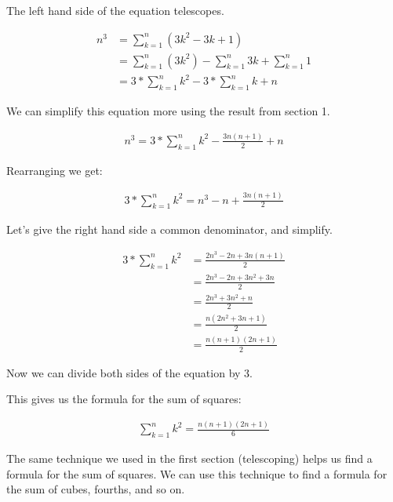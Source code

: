 \documentclass{article}
\begin{document}
\begin{flushleft}
The left hand side of the equation telescopes.
\end{flushleft}
\begin{align*}
n^3 &= \sum_{k=1}^{n} (3k^2 - 3k + 1) \\
&= \sum_{k=1}^{n} (3k^2) - \sum_{k=1}^{n} 3k + \sum_{k=1}^{n} 1 \\
&= 3 * \sum_{k=1}^{n} k^2 - 3 * \sum_{k=1}^{n} k + n
\end{align*}
\begin{flushleft}
We can simplify this equation more using the result from section 1.
\end{flushleft}
\begin{align*}
n^3 =  3 * \sum_{k=1}^{n} k^2 - \frac{3n(n+1)}{2} + n
\end{align*}
\begin{flushleft}
Rearranging we get:
\end{flushleft}
\begin{align*}
3 * \sum_{k=1}^{n} k^2 = n^3 - n + \frac{3n(n+1)}{2} 
\end{align*}
\begin{flushleft}
Let's give the right hand side a common denominator, and simplify.
\end{flushleft}
\begin{align*}
3 * \sum_{k=1}^{n} k^2 &= \frac{2n^3 - 2n + 3n(n+1)}{2} \\
&= \frac{2n^3 - 2n + 3n^2 + 3n}{2} \\
&= \frac{2n^3 + 3n^2 + n}{2} \\
&= \frac{n(2n^2 + 3n + 1)}{2} \\
&= \frac{n(n+1)(2n+1)}{2} 
\end{align*}
\begin{flushleft}
Now we can divide both sides of the equation by 3.
\end{flushleft}
\begin{flushleft}
This gives us the formula for the sum of squares:
\end{flushleft}
\begin{align}
\sum_{k=1}^{n} k^2 = \frac{n(n+1)(2n+1)}{6}
\end{align}
\begin{flushleft}
The same technique we used in the first section (telescoping) helps us find a formula for the sum of squares. We can use this technique to find a formula for the sum of cubes, fourths, and so on.
\end{flushleft}
\end{document}
